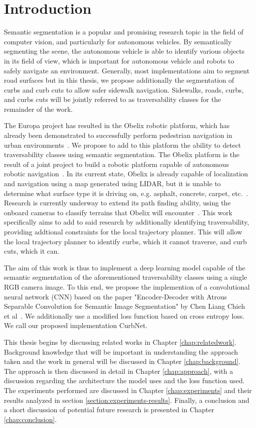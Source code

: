 \chapter{Introduction}\label{chap:introduction}
Semantic segmentation is a popular and promising research topic in the field of computer vision, and particularly for autonomous vehicles.
By semantically segmenting the scene, the autonomous vehicle is able to identify various objects in its field of view, which is important for autonomous vehicle and robots to safely navigate an environment.
Generally, most implementations aim to segment road surfaces but in this thesis, we propose additionally the segmentation of curbs and curb cuts to allow safer sidewalk navigation.
Sidewalks, roads, curbs, and curbs cuts will be jointly referred to as traversability classes for the remainder of the work.

The Europa project has resulted in the Obelix robotic platform, which has already been demonstrated to successfully perform pedestrian navigation in urban environments~\cite{europa}\cite{obelix-slam}.
We propose to add to this platform the ability to detect traversability classes using semantic segmentation.
The Obelix platform is the result of a joint project to build a robotic platform capable of autonomous robotic navigation~\cite{europa}.
In its current state, Obelix is already capable of localization and navigation using a map generated using LIDAR, but it is unable to determine what surface type it is driving on, e.g. asphalt, concrete, carpet, etc.~\cite{jannik}.
Research is currently underway to extend its path finding ability, using the onboard cameras to classify terrains that Obelix will encounter~\cite{jannik}.
This work specifically aims to add to said research by additionally identifying traversability, providing addtional constraints for the local trajectory planner.
This will allow the local trajectory planner to identify curbs, which it cannot traverse, and curb cuts, which it can.



The aim of this work is thus to implement a deep learning model capable of the semantic segmentation of the aforementioned traversability classes using a single RGB camera image.
To this end, we propose the implemention of a convolutional neural network (CNN) based on the paper "Encoder-Decoder with Atrous Separable Convolution for Semantic Image Segmentation" by Chen Liang Chieh et al~\cite{deeplab}.
We additionally use a modified loss function based on cross entropy loss.
We call our proposed implementation CurbNet.

This thesis begins by discussing related works in Chapter \ref{chap:relatedwork}. 
Background knowledge that will be important in understanding the approach taken and the work in general will be discussed in Chapter \ref{chap:background}.
The approach is then discussed in detail in Chapter \ref{chap:approach}, with a discussion regarding the architecture the model uses and the loss function used.
The experiments performed are discussed in Chapter \ref{chap:experiments} and their results analyzed in section \ref{section:experiments-results}.
Finally, a conclusion and a short discussion of potential future research is presented in Chapter \ref{chap:conclusion}.